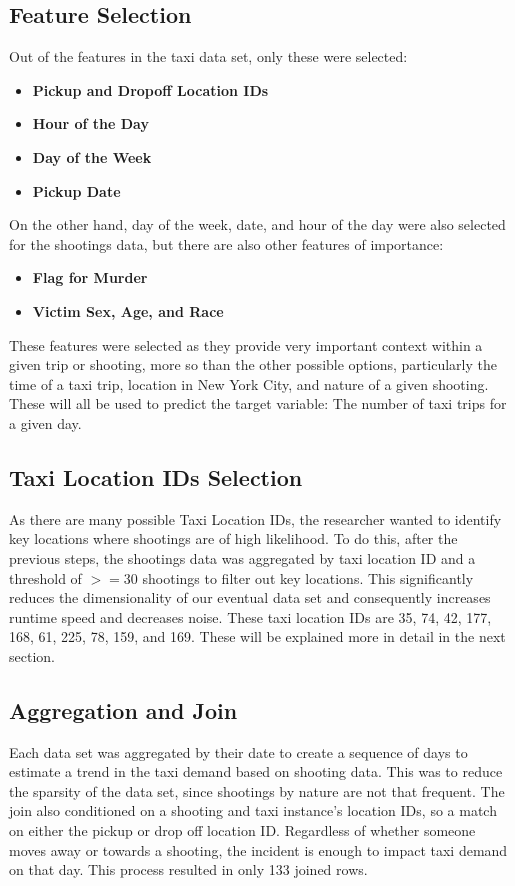\documentclass[11pt]{article}
\begin{document}
\subsection{Feature Selection}
Out of the features in the taxi data set, only these were selected:
\begin{itemize}
    \item \textbf{Pickup and Dropoff Location IDs}
    \item \textbf{Hour of the Day}
    \item \textbf{Day of the Week}
    \item \textbf{Pickup Date}
\end{itemize}
On the other hand, day of the week, date, and hour of the day were also selected for the shootings data, but there are also other features of importance:
\begin{itemize}
    \item \textbf{Flag for Murder}
    \item \textbf{Victim Sex, Age, and Race}
\end{itemize}
These features were selected as they provide very important context within a given trip or shooting, more so than the other possible options, particularly the time of a taxi trip, location in New York City, and nature of a given shooting. These will all be used to predict the target variable: The number of taxi trips for a given day.

\subsection{Taxi Location IDs Selection}
As there are many possible Taxi Location IDs, the researcher wanted to identify key locations where shootings are of high likelihood. To do this, after the previous steps, the shootings data was aggregated by taxi location ID and a threshold of $>= 30$ shootings to filter out key locations. This significantly reduces the dimensionality of our eventual data set and consequently increases runtime speed and decreases noise. These taxi location IDs are 35, 74, 42, 177, 168, 61, 225, 78, 159, and 169. These will be explained more in detail in the next section.

\subsection{Aggregation and Join}
Each data set was aggregated by their date to create a sequence of days to estimate a trend in the taxi demand based on shooting data. This was to reduce the sparsity of the data set, since shootings by nature are not that frequent. The join also conditioned on a shooting and taxi instance's location IDs, so a match on either the pickup or drop off location ID. Regardless of whether someone moves away or towards a shooting, the incident is enough to impact taxi demand on that day. This process resulted in only 133 joined rows.
\end{document}

